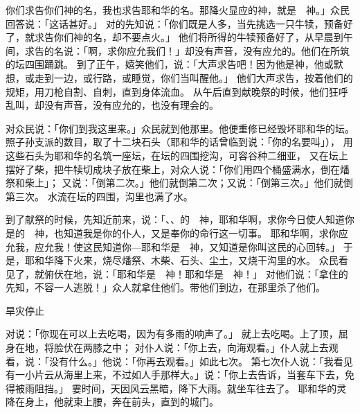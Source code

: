 {你们求告你们神的名，我也求告耶和华的名。那降火显应的神，就是　神。」众民回答说：「这话甚好。」
对{}的先知说：「你们既是人多，当先挑选一只牛犊，预备好了，就求告你们神的名，却不要点火。」
他们将所得的牛犊预备好了，从早晨到午间，求告{}的名说：「{}啊，求你应允我们！」却没有声音，没有应允的。他们在所筑的坛四围踊跳。
到了正午，{}嬉笑他们，说：「大声求告吧！因为他是神，他或默想，或走到一边，或行路，或睡觉，你们当叫醒他。」
他们大声求告，按着他们的规矩，用刀枪自割、自刺，直到身体流血。
从午后直到献晚祭的时候，他们狂呼乱叫，却没有声音，没有应允的，也没有理会的。
\par }{\PP {}对众民说：「你们到我这里来。」众民就到他那里。他便重修已经毁坏耶和华的坛。
照{}子孙支派的数目，取了十二块石头（耶和华的话曾临到{}说：「你的名要叫{}」），
用这些石头为耶和华的名筑一座坛，在坛的四围挖沟，可容谷种二细亚，
又在坛上摆好了柴，把牛犊切成块子放在柴上，对众人说：「你们用四个桶盛满水，倒在燔祭和柴上」；
又说：「倒第二次。」他们就倒第二次；又说：「倒第三次。」他们就倒第三次。
水流在坛的四围，沟里也满了水。
\par }{\PP {}到了献{}祭的时候，先知{}近前来，说：「{}、{}、{}的　神，耶和华啊，求你今日使人知道你是{}的　神，也知道我是你的仆人，又是奉你的命行这一切事。
耶和华啊，求你应允我，应允我！使这民知道你—耶和华是　神，又知道是你叫这民的心回转。」
于是，耶和华降下火来，烧尽燔祭、木柴、石头、尘土，又烧干沟里的水。
众民看见了，就俯伏在地，说：「耶和华是　神！耶和华是　神！」
对他们说：「拿住{}的先知，不容一人逃脱！」众人就拿住他们。{}带他们到{}边，在那里杀了他们。
\par }{\SH 旱灾停止
\par }{\PP {}对{}说：「你现在可以上去吃喝，因为有多雨的响声了。」
就上去吃喝。{}上了{}顶，屈身在地，将脸伏在两膝之中；
对仆人说：「你上去，向海观看。」仆人就上去观看，说：「没有什么。」他说：「你再去观看。」如此七次。
第七次仆人说：「我看见有一小片云从海里上来，不过如人手那样大。」{}说：「你上去告诉{}，当套车下去，免得被雨阻挡。」
霎时间，天因风云黑暗，降下大雨。{}就坐车往{}去了。
耶和华的灵降在{}身上，他就束上腰，奔在{}前头，直到{}的城门。

}
